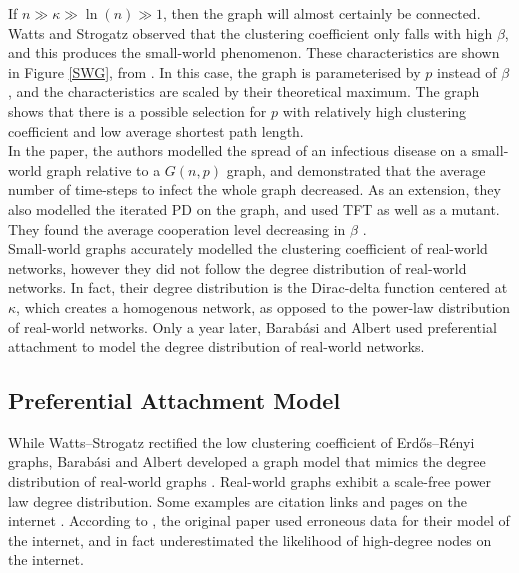 If $n \gg \kappa \gg \ln(n) \gg 1 $, then the graph will almost certainly be connected. Watts and Strogatz observed that the clustering coefficient only falls with high $\beta$, and this produces the small-world phenomenon. These characteristics are shown in Figure \ref{SWG}, from \cite{RN93}. In this case, the graph is parameterised by $p$ instead of $\beta$, and the characteristics are scaled by their theoretical maximum. The graph shows that there is a possible selection for $p$ with relatively high clustering coefficient and low average shortest path length.  \\
\FloatBarrier
{}
\FloatBarrier
In the paper, the authors modelled the spread of an infectious disease on a small-world graph relative to a $G(n,p)$ graph, and demonstrated that the average number of time-steps to infect the whole graph decreased. As an extension, they also modelled the iterated PD on the graph, and used TFT as well as a mutant. They found the average cooperation level decreasing in $\beta$ \cite{RN58}. \\

Small-world graphs accurately modelled the clustering coefficient of real-world networks, however they did not follow the degree distribution of real-world networks. In fact, their degree distribution is the Dirac-delta function centered at $\kappa$, which creates a homogenous network, as opposed to the power-law distribution of real-world networks. Only a year later, Barab\'{a}si and Albert used preferential attachment to model the degree distribution of real-world networks. \\
 
 
 
 
 
\subsection{Preferential Attachment Model} \label{BA}
While Watts--Strogatz rectified the low clustering coefficient of Erd\H{o}s--R\'enyi graphs, Barab\'{a}si and Albert developed a graph model that mimics the degree distribution of real-world graphs \cite{RN55}. Real-world graphs exhibit a scale-free power law degree distribution. Some examples are citation links and pages on the internet \cite{RN55}. According to \cite{RN56}, the original paper used erroneous data for their model of the internet, and in fact underestimated the likelihood of high-degree nodes on the internet. \\

